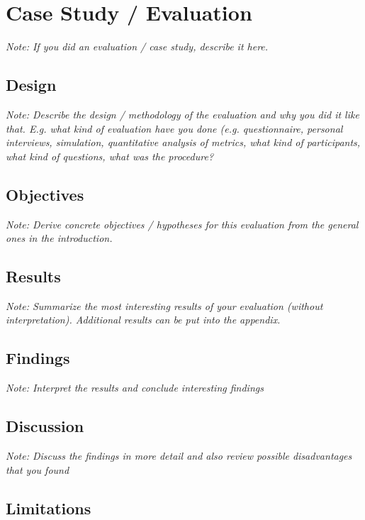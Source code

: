 \documentclass[a4paper,12pt,twoside]{report}
\begin{document}
\chapter{Case Study / Evaluation}

\textit{Note: If you did an evaluation / case study, describe it here.}

\section{Design}

\textit{Note: Describe the design / methodology of the evaluation and why you did it like that. E.g. what kind of evaluation have you done (e.g. questionnaire, personal interviews, simulation, quantitative analysis of metrics, what kind of participants, what kind of questions, what was the procedure?}

\section{Objectives}

\textit{Note: Derive concrete objectives / hypotheses for this evaluation from the general ones in the introduction.}

\section{Results}

\textit{Note: Summarize the most interesting results of your evaluation (without interpretation). Additional results can be put into the appendix.}

\section{Findings}

\textit{Note: Interpret the results and conclude interesting findings}

\section{Discussion}

\textit{Note: Discuss the findings in more detail and also review possible disadvantages that you found}

\section{Limitations}
\end{document}
